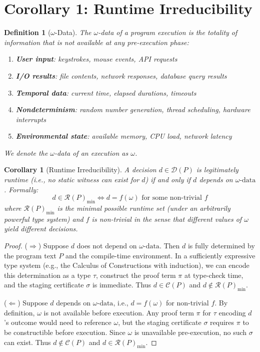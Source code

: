 \documentclass[11pt]{article}
\newtheorem{corollary}[theorem]{Corollary}
\newtheorem{definition}[theorem]{Definition}
\newcommand{\DP}{\mathcal{D}(P)}
\newcommand{\CP}{\mathcal{C}(P)}
\newcommand{\RP}{\mathcal{R}(P)}
\newcommand{\omegadata}{\omega\text{-data}}
\begin{document}
\section{Corollary 1: Runtime Irreducibility}
\label{sec:corollary1}

\begin{definition}[$\omega$-Data]
\label{def:omega-data}
The \emph{$\omega$-data} of a program execution is the totality of information that is
not available at any pre-execution phase:
\begin{enumerate}[nosep]
  \item \textbf{User input}: keystrokes, mouse events, API requests
  \item \textbf{I/O results}: file contents, network responses, database query results
  \item \textbf{Temporal data}: current time, elapsed durations, timeouts
  \item \textbf{Nondeterminism}: random number generation, thread scheduling, hardware interrupts
  \item \textbf{Environmental state}: available memory, CPU load, network latency
\end{enumerate}
We denote the $\omega$-data of an execution as $\omega$.
\end{definition}

\begin{corollary}[Runtime Irreducibility]
\label{cor:irreducibility}
A decision $d \in \DP$ is \emph{legitimately runtime} (i.e., no static witness can
exist for $d$) if and only if $d$ depends on $\omegadata$. Formally:
\[
  d \in \RP_{\min} \iff d = f(\omega) \text{ for some non-trivial } f
\]
where $\RP_{\min}$ is the minimal possible runtime set (under an arbitrarily powerful
type system) and $f$ is non-trivial in the sense that different values of $\omega$
yield different decisions.
\end{corollary}

\begin{proof}
($\Rightarrow$) Suppose $d$ does not depend on $\omegadata$. Then $d$ is fully
determined by the program text $P$ and the compile-time environment. In a sufficiently
expressive type system (e.g., the Calculus of Constructions with induction), we can
encode this determination as a type $\tau$, construct the proof term $\pi$ at type-check
time, and the staging certificate $\sigma$ is immediate. Thus $d \in \CP$ and
$d \notin \RP_{\min}$.

($\Leftarrow$) Suppose $d$ depends on $\omegadata$, i.e., $d = f(\omega)$ for
non-trivial $f$. By definition, $\omega$ is not available before execution. Any proof
term $\pi$ for $\tau$ encoding $d$'s outcome would need to reference $\omega$, but
the staging certificate $\sigma$ requires $\pi$ to be constructible before execution.
Since $\omega$ is unavailable pre-execution, no such $\sigma$ can exist. Thus
$d \notin \CP$ and $d \in \RP_{\min}$.
\end{proof}
\end{document}
